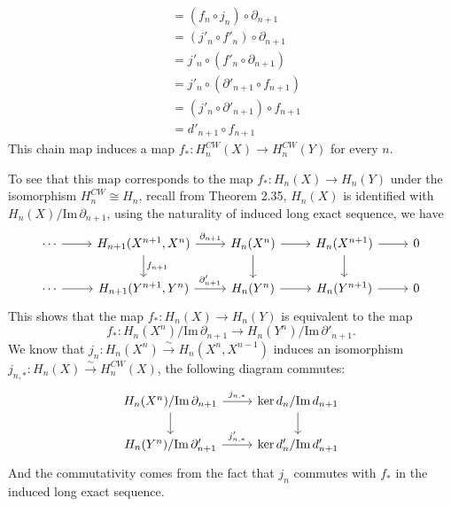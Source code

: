 \documentclass[a4paper, 12pt]{article}
\begin{document}
\begin{solution}
\begin{align*}
                    &=(f_n\circ j_n)\circ \partial_{n+1}\\
                    &=(j'_n\circ f'_n)\circ \partial_{n+1}\\ 
                    &=j'_n\circ (f'_n\circ \partial_{n+1})\\ 
                    &=j'_n\circ (\partial'_{n+1}\circ f_{n+1})\\ 
                    &=(j'_n\circ \partial'_{n+1})\circ f_{n+1}\\ 
                    &=d'_{n+1}\circ f_{n+1}
\end{align*}
This chain map induces a map \(f_*:H_n^{CW}(X)\rightarrow H_n^{CW}(Y)\) for every \(n\). 

To see that this map corresponds to the map \(f_*:H_n(X)\rightarrow H_n(Y)\) under the isomorphism \(H_n^{CW}\cong H_n\), recall from Theorem 2.35, \(H_n(X)\) is identified 
with \(H_n(X)/\text{Im}\, \partial_{n+1}\), using the naturality of induced long exact sequence, we have 
\[\begin{tikzcd}
	\cdots & {H_{n+1}(X^{n+1},X^n)} & {H_n(X^n)} & {H_n(X^{n+1})} & 0 \\
	\cdots & {H_{n+1}(Y^{n+1},Y^n)} & {H_n(Y^n)} & {H_n(Y^{n+1})} & 0
	\arrow[from=1-1, to=1-2]
	\arrow["{\partial_{n+1}}", from=1-2, to=1-3]
	\arrow["{f_{n+1}}", from=1-2, to=2-2]
	\arrow[from=1-3, to=1-4]
	\arrow[from=1-3, to=2-3]
	\arrow[from=1-4, to=1-5]
	\arrow[from=1-4, to=2-4]
	\arrow[from=2-1, to=2-2]
	\arrow["{\partial'_{n+1}}", from=2-2, to=2-3]
	\arrow[from=2-3, to=2-4]
	\arrow[from=2-4, to=2-5]
\end{tikzcd}\]
This shows that the map \(f_*:H_n(X)\rightarrow H_n(Y)\) is equivalent to the map 
\[f_*:H_n(X^n)/\text{Im}\, \partial_{n+1}\rightarrow H_n(Y^n)/\text{Im}\, \partial'_{n+1}.\]
We know that \(j_n:H_n(X^n)\xrightarrow{\sim} H_n(X^n,X^{n-1})\) induces an isomorphism \(j_{n,*}:H_n(X)\xrightarrow{\sim} H_n^{CW}(X)\), the following diagram commutes: 
\[\begin{tikzcd}
	{H_n(X^n)/\text{Im}\, \partial_{n+1}} & {\ker d_n/\text{Im}\, d_{n+1}} \\
	{H_n(Y^n)/\text{Im}\,\partial'_{n+1}} & {\ker d'_n/\text{Im}\, d'_{n+1}}
	\arrow["{j_{n,*}}", from=1-1, to=1-2]
	\arrow[from=1-1, to=2-1]
	\arrow[from=1-2, to=2-2]
	\arrow["{j'_{n,*}}", from=2-1, to=2-2]
\end{tikzcd}\]
And the commutativity comes from the fact that \(j_n\) commutes with \(f_*\) in the induced long exact sequence.
\end{solution}
\end{document}
